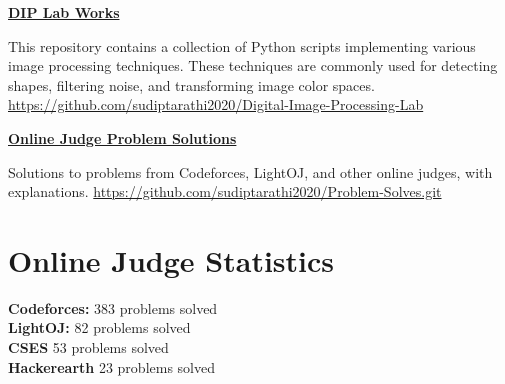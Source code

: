\documentclass[a4paper,10pt]{article}
\begin{document}
\href{https://github.com/sudiptarathi2020/Digital-Image-Processing-Lab}{\textbf{DIP Lab Works}}
\begin{boxB}
    This repository contains a collection of Python scripts implementing various image processing techniques. These techniques are commonly used for detecting shapes, filtering noise, and transforming image color spaces.\\ \href{https://github.com/sudiptarathi2020/Digital-Image-Processing-Lab}{https://github.com/sudiptarathi2020/Digital-Image-Processing-Lab}
\end{boxB}


\href{https://github.com/sudiptarathi2020/Problem-Solves.git}{\textbf{Online Judge Problem Solutions}}
\begin{boxB}
    Solutions to problems from Codeforces, LightOJ, and other online judges, with explanations.  \href{https://github.com/sudiptarathi2020/Problem-Solves.git}{https://github.com/sudiptarathi2020/Problem-Solves.git}
\end{boxB}




\section*{Online Judge Statistics}
\begin{multicols}{2}
\textbf{Codeforces:} 383 problems solved \\
\textbf{LightOJ:} 82 problems solved \\
\textbf{CSES} 53 problems solved \\
\textbf{Hackerearth} 23 problems solved
\end{multicols}
\end{document}

